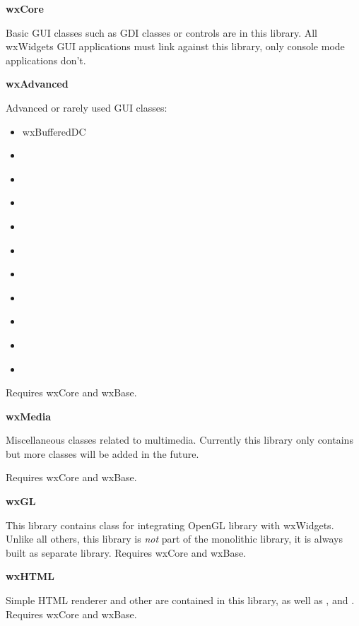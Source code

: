 {\large {\bf wxCore}}

Basic GUI classes such as GDI classes or controls are in this library. All
wxWidgets GUI applications must link against this library, only console mode
applications don't.

{\large {\bf wxAdvanced}}

Advanced or rarely used GUI classes:

\begin{itemize}\itemsep=0pt
\item{ wxBufferedDC }
\item{  }
\item{  }
\item{  }
\item{  }
\item{  }
\item{  }
\item{  }
\item{  }
\item{  }
\item{  }
\end{itemize}

Requires wxCore and wxBase.

{\large {\bf wxMedia}}

Miscellaneous classes related to multimedia. Currently this library only
contains  but more classes will be added in
the future.

Requires wxCore and wxBase.

{\large {\bf wxGL}}

This library contains  class for integrating
OpenGL library with wxWidgets. Unlike all others, this library is {\em not}
 part of the monolithic library, it is always built as separate library.
Requires wxCore and wxBase.

{\large {\bf wxHTML}}

Simple HTML renderer and other  are
contained in this library, as well as
 ,
  and
 . Requires wxCore and wxBase.

